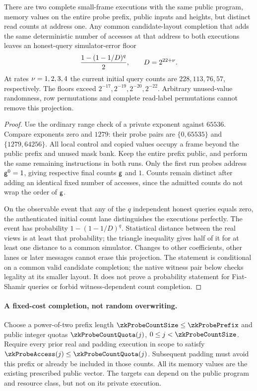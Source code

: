 \begin{proposition}\label{prop:zk-probe-count-floor}
There are two complete small-frame executions with the same public program, memory values on the entire probe prefix, public inputs and heights, but distinct read counts at address one. Any common candidate-layout completion that adds the same deterministic number of accesses at that address to both executions leaves an honest-query simulator-error floor
\[
 \frac{1-(1-1/D)^q}{2},\qquad D=2^{22+\nu}.
\]
At rates $\nu=1,2,3,4$ the current initial query counts are $228,113,76,57$, respectively. The floors exceed $2^{-17},2^{-19},2^{-20},2^{-22}$. Arbitrary unused-value randomness, row permutations and complete read-label permutations cannot remove this projection.
\end{proposition}
\begin{proof}
Use the ordinary range check of a private exponent against $65536$. Compare exponents zero and $1279$: their probe pairs are $\{0,65535\}$ and $\{1279,64256\}$. All local control and copied values occupy a frame beyond the public prefix and unused mask bank. Keep the entire prefix public, and perform the same remaining instructions in both runs. Only the first run probes address $\mathsf{g}^0=1$, giving respective final counts $\mathsf{g}$ and $1$. Counts remain distinct after adding an identical fixed number of accesses, since the admitted counts do not wrap the order of $\mathsf{g}$.

On the observable event that any of the $q$ independent honest queries equals zero, the authenticated initial count lane distinguishes the executions perfectly. The event has probability $1-(1-1/D)^q$. Statistical distance between the real views is at least that probability; the triangle inequality gives half of it for at least one distance to a common simulator. Changes to other coefficients, other lanes or later messages cannot erase this projection. The statement is conditional on a common valid candidate completion; the native witness pair below checks legality at its smaller layout. It does not prove a probability statement for Fiat-Shamir queries or forbid witness-dependent count completion.
\end{proof}

\paragraph{A fixed-cost completion, not random overwriting.} Choose a power-of-two prefix length $\zkProbeCountSize\le\zkProbePrefix$ and public integer quotas $\zkProbeCountQuota(j)$, $0\le j<\zkProbeCountSize$. Require every prior real and padding execution in scope to satisfy $\zkProbeAccess(j)\le\zkProbeCountQuota(j)$. Subsequent padding must avoid this prefix or already be included in those counts. All its memory values are the existing prescribed public vector. The targets can depend on the public program and resource class, but not on its private execution.

